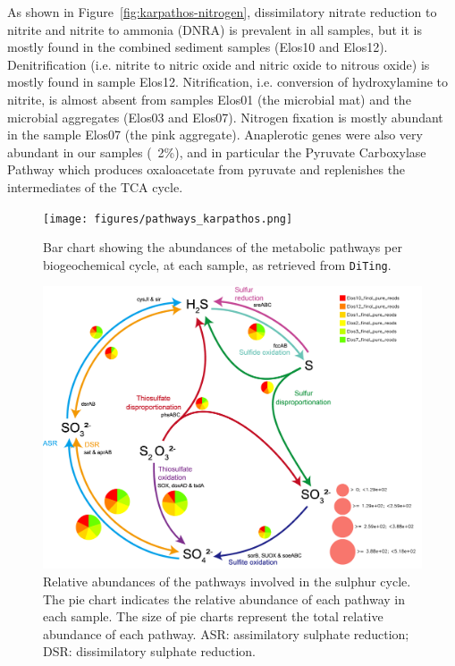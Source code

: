    As shown in Figure~\ref{fig:karpathos-nitrogen}, dissimilatory nitrate reduction to nitrite and nitrite to ammonia (DNRA) is prevalent in all samples, 
   but it is mostly found in the combined sediment samples (Elos10 and Elos12). 
   Denitrification (i.e. nitrite to nitric oxide and nitric oxide to nitrous oxide) is mostly found in sample Elos12. Nitrification, i.e. conversion of 
   hydroxylamine to nitrite, is almost absent from samples Elos01 (the microbial mat) and the microbial aggregates (Elos03 and Elos07). 
   Nitrogen fixation is mostly abundant in the sample Elos07 (the pink aggregate). 
   Anaplerotic genes were also very abundant in our samples (~2\%), and in particular the Pyruvate Carboxylase Pathway which produces oxaloacetate from pyruvate and replenishes the intermediates of the TCA cycle. 


   \begin{figure}[!htbp]
      \centering
      \texttt{[image: figures/pathways\_karpathos.png]}
      \caption[Abundances of the metabolic pathways per biogeochemical cycle, at each sample]{
         Bar chart showing the abundances of the metabolic pathways per biogeochemical cycle, at each sample, as retrieved from \texttt{DiTing}. 
      }
      \label{fig:pathway-abundances}
   \end{figure}   


   \begin{figure}[!htbp]
      \centering
      \includegraphics[width=0.98\columnwidth]{figures/sulfur_cycle_karpathos.png}
      \caption[Relative abundances of the pathways involved in the sulphur cycle]{
         Relative abundances of the pathways involved in the sulphur cycle. 
         The pie chart indicates the relative abundance of each pathway in each sample. 
         The size of pie charts represent the total relative abundance of each pathway. 
         ASR: assimilatory sulphate reduction; DSR: dissimilatory sulphate reduction.
      }
      \label{fig:karpathos-sulfur}
   \end{figure}   


